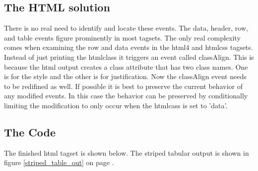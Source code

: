 \subsection{The HTML solution}
There is no real need to identify and locate these events.  The data, header, row,
and table events figure prominently in most tagsets.
The only real complexity comes when examining the row and data events
in the html4 and htmlcss tagsets.  Instead of just 
printing the htmlclass it triggers an event called classAlign.  This is because
the html output creates a class attribute that has two class names.  One is
for the style and the other is for justification.  Now the classAlign event
needs to be redifined as well. If possible it is best to
preserve the current behavior of any modified events.  In this case the
behavior can be preserved by conditionally limiting the modification to 
only occur when the htmlcass is set to 'data'.

\subsection{The Code}
The finished html tagset is shown below. The striped tabular output is shown 
in figure \ref{striped_table_out} on page \pageref{striped_table_out}.

